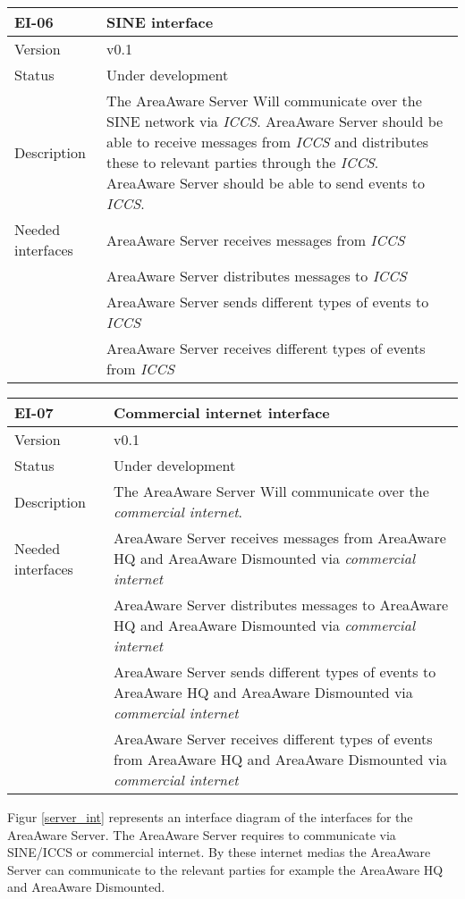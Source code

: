 \begin{longtable}{| p{3.5cm} |  p{10cm} | }
	\hline
	\textbf{EI-06} &  \textbf{SINE interface} \\
	\hline
	Version & v0.1 \\
	\hline
	Status & Under development \\
	\hline
	Description & The AreaAware Server Will communicate over the SINE network via \emph{ICCS}\citep{iccs}. AreaAware Server should be able to receive messages from \emph{ICCS} and distributes these to relevant parties through the \emph{ICCS}.  AreaAware Server should be able to send events to \emph{ICCS}.
	\\
	\hline
	Needed interfaces 
	& AreaAware Server receives messages from \emph{ICCS} \\
	& AreaAware Server distributes messages to \emph{ICCS} \\
	& AreaAware Server sends different types of events to \emph{ICCS} \\
	& AreaAware Server receives different types of events from \emph{ICCS} \\
	\hline
\end{longtable}

\begin{longtable}{| p{3.5cm} |  p{10cm} | }
	\hline
	\textbf{EI-07} &  \textbf{Commercial internet interface} \\
	\hline
	Version & v0.1 \\
	\hline
	Status & Under development \\
	\hline
	Description & The AreaAware Server Will communicate over the \emph{commercial internet}.
	\\
	\hline
	Needed interfaces 
	& AreaAware Server receives messages from AreaAware HQ and AreaAware Dismounted via \emph{commercial internet} \\
	& AreaAware Server distributes messages to AreaAware HQ and AreaAware Dismounted via \emph{commercial internet} \\ 
	& AreaAware Server sends different types of events to AreaAware HQ and AreaAware Dismounted via \emph{commercial internet} \\
	& AreaAware Server receives different types of events from AreaAware HQ and AreaAware Dismounted via \emph{commercial internet} \\
	\hline
\end{longtable}


Figur \ref{server_int} represents an interface diagram of the interfaces for the AreaAware Server. The AreaAware Server requires to communicate via SINE/ICCS or commercial internet. By these internet medias the AreaAware Server can communicate to the relevant parties for example the AreaAware HQ and AreaAware Dismounted.